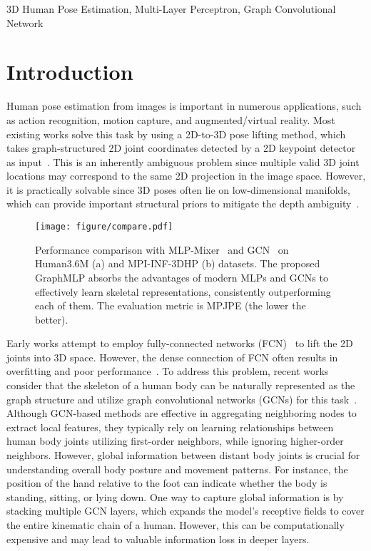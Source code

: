 \documentclass[lettersize,journal]{IEEEtran}
\begin{document}
\begin{IEEEkeywords}
3D Human Pose Estimation, Multi-Layer Perceptron, Graph Convolutional Network
\end{IEEEkeywords}

\section{Introduction}
 Human pose estimation from images is important in numerous applications, such as action recognition, motion capture, and augmented/virtual reality. 
Most existing works solve this task by using a 2D-to-3D pose lifting method, which takes graph-structured 2D joint coordinates detected by a 2D keypoint detector as input~\cite{simplebaseline,wei2019view,chen2021anatomy,hua2022weakly}. 
This is an inherently ambiguous problem since multiple valid 3D joint locations may correspond to the same 2D projection in the image space. 
However, it is practically solvable since 3D poses often lie on low-dimensional manifolds, which can provide important structural priors to mitigate the depth ambiguity~\cite{wang2014robust,ci2019optimizing}. 

\begin{figure}[tb]
  \centering
  \texttt{[image: figure/compare.pdf]}
  \caption
  {Performance comparison with MLP-Mixer~\cite{mlpmixer} and GCN~\cite{stgcn} on Human3.6M (a) and MPI-INF-3DHP (b) datasets. 
  The proposed GraphMLP absorbs the advantages of modern MLPs and GCNs to effectively learn skeletal representations, consistently outperforming each of them.  
  The evaluation metric is MPJPE (the lower the better). 
  }
  \label{fig:compare}
\end{figure}

Early works attempt to employ fully-connected networks (FCN)~\cite{simplebaseline} to lift the 2D joints into 3D space. 
However, the dense connection of FCN often results in overfitting and poor performance~\cite{zeng2021learning}. 
To address this problem, recent works consider that the skeleton of a human body can be naturally represented as the graph structure and utilize graph convolutional networks (GCNs) for this task~\cite{zhao2019semantic,wang2020motion,hu2021conditional}. 
Although GCN-based methods are effective in aggregating neighboring nodes to extract local features, they typically rely on learning relationships between human body joints utilizing first-order neighbors, while ignoring higher-order neighbors. 
However, global information between distant body joints is crucial for understanding overall body posture and movement patterns. For instance, the position of the hand relative to the foot can indicate whether the body is standing, sitting, or lying down. 
One way to capture global information is by stacking multiple GCN layers, which expands the model's receptive fields to cover the entire kinematic chain of a human.
However, this can be computationally expensive and may lead to valuable information loss in deeper layers. 
\end{document}
